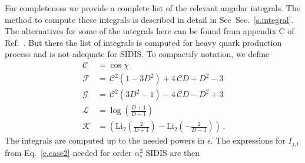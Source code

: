 \documentclass[prd,preprintnumbers,nofootinbib,superscriptaddress,onecolumn,preprint]{revtex4-1}
\newcommand\3[1]{\boldsymbol{#1}}
\newcommand{\cosfun}{\ensuremath{\mathcal{ \, C}}}
\newcommand{\ffun}{\ensuremath{\mathcal{\, F}}}
\newcommand{\ggun}{\ensuremath{ \mathcal{\, G}}}
\newcommand{\llun}{\ensuremath{ \mathcal{\, L}}}
\newcommand{\kkun}{\ensuremath{ \mathcal{\, K}}}
\newcommand{\sref}[1]{Sec.~\ref{s.#1}}
\begin{document}
For completeness we provide
a complete list of the relevant angular integrals. 
The method to compute these integrals is described in detail in
Sec~\sref{integral}. The alternatives for some of the integrals here can be
found from appendix C of Ref.~\cite{Beenakker:1988bq}. But there the list of integrals
is computed for heavy quark production process and is not adequate
for SIDIS. To compactify notation, we define
\begin{align}
\cosfun &{} = \cos \chi \\
\ffun &{} = \cosfun^2 \left(1-3 D^2\right)+4 \cosfun D+D^2-3 \\
\ggun &{} = \cosfun^2 \left(3 D^2-1\right)-4 \cosfun D-D^2+3 \\ 
\llun &{} = \log \left(\frac{D+1}{D-1}\right) \\ 
\kkun &{} = \left(\text{Li}_2\left(\frac{2}{D+1}\right)-\text{Li}_2\left(-\frac{2}{D-1}\right)\right) 
\,.
\end{align}
The integrals are computed up to the needed powers in $\epsilon$. The expressions 
for $I_{j,l}$ from Eq.~\ref{e.case2} needed for order $\alpha_s^2$ SIDIS are then
\end{document}
